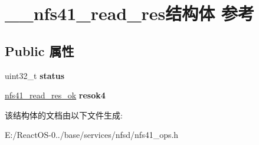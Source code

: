 \hypertarget{struct____nfs41__read__res}{}\section{\+\_\+\+\_\+nfs41\+\_\+read\+\_\+res结构体 参考}
\label{struct____nfs41__read__res}
\subsection*{Public 属性}
\begin{DoxyCompactItemize}
\item 
\mbox{\label{struct____nfs41__read__res_a75dfb9ea5bfde8beeaa358510b078c85}} 
uint32\+\_\+t {\bfseries status}
\item 
\mbox{\label{struct____nfs41__read__res_a59766988b233053210bba189251da7af}} 
\hyperlink{struct____nfs41__read__res__ok}{nfs41\+\_\+read\+\_\+res\+\_\+ok} {\bfseries resok4}
\end{DoxyCompactItemize}


该结构体的文档由以下文件生成\+:\begin{DoxyCompactItemize}
\item 
E\+:/\+React\+O\+S-\/0../base/services/nfsd/nfs41\+\_\+ops.\+h\end{DoxyCompactItemize}
